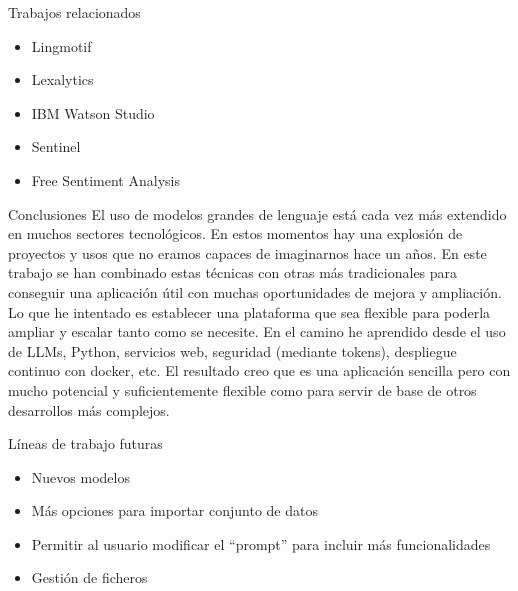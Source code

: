 \documentclass[aspectratio=169,xcolor=dvipsnames, t]{beamer}
\begin{document}

\begin{frame}{Trabajos relacionados}
    \begin{itemize}
        \item Lingmotif
        \item Lexalytics
        \item IBM Watson Studio
        \item Sentinel
        \item Free Sentiment Analysis   
    \end{itemize}
\end{frame}


\begin{frame}{Conclusiones}
    El uso de modelos grandes de lenguaje está cada vez más extendido en muchos sectores tecnológicos.
En estos momentos hay una explosión de proyectos y usos que no eramos capaces de imaginarnos hace un años.
En este trabajo se han combinado estas técnicas con otras más tradicionales para conseguir una aplicación 
útil con muchas oportunidades de mejora y ampliación.
Lo que he intentado es establecer una plataforma que sea flexible para poderla ampliar y escalar tanto como se necesite.
En el camino he aprendido desde el uso de LLMs, Python, servicios web, seguridad (mediante tokens), 
despliegue continuo con docker, etc. El resultado creo que es una aplicación sencilla pero 
con mucho potencial y suficientemente flexible como para servir de base de otros desarrollos más complejos.
\end{frame}

\begin{frame}{Líneas de trabajo futuras}
    \begin{itemize}
        \item Nuevos modelos
        \item Más opciones para importar conjunto de datos
        \item Permitir al usuario modificar el ``{prompt}'' para incluir más funcionalidades
        \item Gestión de ficheros
    \end{itemize}
\end{frame}
\end{document}
